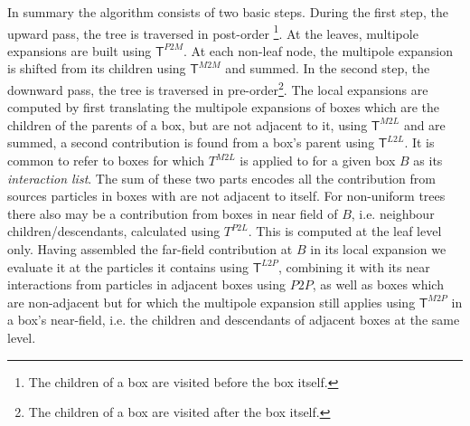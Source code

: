 In summary the algorithm consists of two basic steps. During the first step, the upward pass, the tree is traversed in post-order \footnote{The children of a box are visited before the box itself.}. At the leaves, multipole expansions are built using $\mathsf{T}^{P2M}$. At each non-leaf node, the multipole expansion is shifted from its children using $\mathsf{T}^{M2M}$ and summed. In the second step, the downward pass, the tree is traversed in pre-order\footnote{The children of a box are visited after the box itself.}. The local expansions are computed by first translating the multipole expansions of boxes which are the children of the parents of a box, but are not adjacent to it, using $\mathsf{T}^{M2L}$ and are summed, a second contribution is found from a box's parent using $\mathsf{T}^{L2L}$. It is common to refer to boxes for which $T^{M2L}$ is applied to for a given box $B$ as its \textit{interaction list}. The sum of these two parts encodes all the contribution from sources particles in boxes with are not adjacent to itself. For non-uniform trees there also may be a contribution from boxes in near field of $B$, i.e. neighbour children/descendants, calculated using $T^{P2L}$. This is computed at the leaf level only. Having assembled the far-field contribution at $B$ in its local expansion we evaluate it at the particles it contains using $\mathsf{T}^{L2P}$, combining it with its near interactions from particles in adjacent boxes using $P2P$, as well as boxes which are non-adjacent but for which the multipole expansion still applies using $\mathsf{T}^{M2P}$ in a box's near-field, i.e. the children and descendants of adjacent boxes at the same level.

